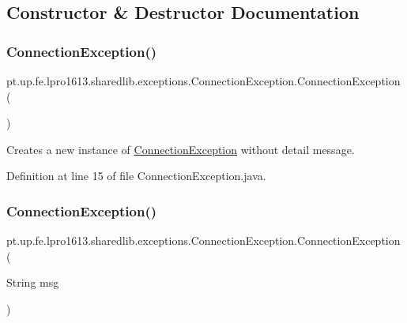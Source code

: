 \subsection{Constructor \& Destructor Documentation}
\hypertarget{classpt_1_1up_1_1fe_1_1lpro1613_1_1sharedlib_1_1exceptions_1_1_connection_exception_a0263c99be76976a295eb555d769ad902}{}\label{classpt_1_1up_1_1fe_1_1lpro1613_1_1sharedlib_1_1exceptions_1_1_connection_exception_a0263c99be76976a295eb555d769ad902} 
\subsubsection{\texorpdfstring{Connection\+Exception()}{ConnectionException()}\hspace{0.1cm}{\footnotesize\ttfamily [1/3]}}
{\footnotesize\ttfamily pt.\+up.\+fe.\+lpro1613.\+sharedlib.\+exceptions.\+Connection\+Exception.\+Connection\+Exception (\begin{DoxyParamCaption}{ }\end{DoxyParamCaption})}

Creates a new instance of {\ttfamily \hyperlink{classpt_1_1up_1_1fe_1_1lpro1613_1_1sharedlib_1_1exceptions_1_1_connection_exception}{Connection\+Exception}} without detail message. 

Definition at line 15 of file Connection\+Exception.\+java.

\hypertarget{classpt_1_1up_1_1fe_1_1lpro1613_1_1sharedlib_1_1exceptions_1_1_connection_exception_a7ffdcb8ba15364c95b96154fef1624ee}{}\label{classpt_1_1up_1_1fe_1_1lpro1613_1_1sharedlib_1_1exceptions_1_1_connection_exception_a7ffdcb8ba15364c95b96154fef1624ee} 
\subsubsection{\texorpdfstring{Connection\+Exception()}{ConnectionException()}\hspace{0.1cm}{\footnotesize\ttfamily [2/3]}}
{\footnotesize\ttfamily pt.\+up.\+fe.\+lpro1613.\+sharedlib.\+exceptions.\+Connection\+Exception.\+Connection\+Exception (\begin{DoxyParamCaption}\item[{String}]{msg }\end{DoxyParamCaption})}

